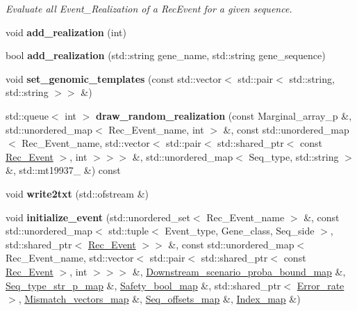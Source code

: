 \begin{DoxyCompactItemize}
\begin{DoxyCompactList}\small\item\em Evaluate all Event\+\_\+\+Realization of a Rec\+Event for a given sequence. \end{DoxyCompactList}\item 
\mbox{\label{classGene__choice_a7b274bb7d2224f66366636cecc487b72}} 
void {\bfseries add\+\_\+realization} (int)
\item 
\mbox{\label{classGene__choice_a77a1eadc4a10c5adfd10b80f3510efbc}} 
bool {\bfseries add\+\_\+realization} (std\+::string gene\+\_\+name, std\+::string gene\+\_\+sequence)
\item 
\mbox{\label{classGene__choice_a679b1a47747c90b88c7905fbdf5dddc6}} 
void {\bfseries set\+\_\+genomic\+\_\+templates} (const std\+::vector$<$ std\+::pair$<$ std\+::string, std\+::string $>$$>$ \&)
\item 
\mbox{\label{classGene__choice_a5a439725d4a2e1e7b4ebefce7ff5527e}} 
std\+::queue$<$ int $>$ {\bfseries draw\+\_\+random\+\_\+realization} (const Marginal\+\_\+array\+\_\+p \&, std\+::unordered\+\_\+map$<$ Rec\+\_\+\+Event\+\_\+name, int $>$ \&, const std\+::unordered\+\_\+map$<$ Rec\+\_\+\+Event\+\_\+name, std\+::vector$<$ std\+::pair$<$ std\+::shared\+\_\+ptr$<$ const \hyperlink{classRec__Event}{Rec\+\_\+\+Event} $>$, int $>$$>$$>$ \&, std\+::unordered\+\_\+map$<$ Seq\+\_\+type, std\+::string $>$ \&, std\+::mt19937\+\_ \&) const
\item 
\mbox{\label{classGene__choice_a9f7c9303d2c0d3a0de6b8098ebf9317b}} 
void {\bfseries write2txt} (std\+::ofstream \&)
\item 
\mbox{\label{classGene__choice_ab76e5a240887c7c8b4b47abe350e52b2}} 
void {\bfseries initialize\+\_\+event} (std\+::unordered\+\_\+set$<$ Rec\+\_\+\+Event\+\_\+name $>$ \&, const std\+::unordered\+\_\+map$<$ std\+::tuple$<$ Event\+\_\+type, Gene\+\_\+class, Seq\+\_\+side $>$, std\+::shared\+\_\+ptr$<$ \hyperlink{classRec__Event}{Rec\+\_\+\+Event} $>$$>$ \&, const std\+::unordered\+\_\+map$<$ Rec\+\_\+\+Event\+\_\+name, std\+::vector$<$ std\+::pair$<$ std\+::shared\+\_\+ptr$<$ const \hyperlink{classRec__Event}{Rec\+\_\+\+Event} $>$, int $>$$>$$>$ \&, \hyperlink{classEnum__fast__memory__map}{Downstream\+\_\+scenario\+\_\+proba\+\_\+bound\+\_\+map} \&, \hyperlink{classEnum__fast__memory__map}{Seq\+\_\+type\+\_\+str\+\_\+p\+\_\+map} \&, \hyperlink{classEnum__fast__memory__map}{Safety\+\_\+bool\+\_\+map} \&, std\+::shared\+\_\+ptr$<$ \hyperlink{classError__rate}{Error\+\_\+rate} $>$, \hyperlink{classEnum__fast__memory__map}{Mismatch\+\_\+vectors\+\_\+map} \&, \hyperlink{classEnum__fast__memory__dual__key__map}{Seq\+\_\+offsets\+\_\+map} \&, \hyperlink{classEnum__fast__memory__map}{Index\+\_\+map} \&)

\end{DoxyCompactItemize}
